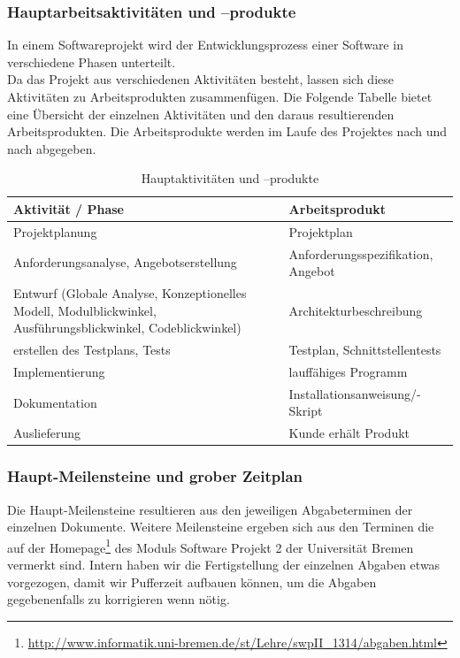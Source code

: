 \documentclass[fontsize=12pt,paper=a4,twoside]{scrartcl}
\begin{document}
\subsubsection{Hauptarbeitsaktivitäten und --produkte}

In einem Softwareprojekt wird der Entwicklungsprozess einer Software in verschiedene Phasen unterteilt.\\
Da das Projekt aus verschiedenen Aktivitäten besteht, lassen sich diese Aktivitäten zu Arbeitsprodukten zusammenfügen. Die Folgende Tabelle bietet eine Übersicht der einzelnen Aktivitäten und den daraus resultierenden Arbeitsprodukten. Die Arbeitsprodukte werden im Laufe des Projektes nach und nach abgegeben.\\

\begin{table}[htbp]
\caption{Hauptaktivitäten und --produkte}
\centering
\begin{tabular}{p{7cm}|p{7cm}}
\hline Aktivität / Phase & Arbeitsprodukt \\ \hline
\hline Projektplanung & Projektplan\\
\hline Anforderungsanalyse, Angebotserstellung & Anforderungsspezifikation, Angebot\\
\hline Entwurf (Globale Analyse, Konzeptionelles Modell, Modulblickwinkel, Ausführungsblickwinkel, Codeblickwinkel) & Architekturbeschreibung\\
\hline erstellen des Testplans, Tests & Testplan, Schnittstellentests\\
\hline Implementierung & lauffähiges Programm\\
\hline Dokumentation & Installationsanweisung/-Skript\\
\hline Auslieferung & Kunde erhält Produkt\\
\hline 
\end{tabular}
\end{table}

\newpage

\subsubsection{Haupt-Meilensteine und grober Zeitplan}

Die Haupt-Meilensteine resultieren aus den jeweiligen Abgabeterminen der einzelnen Dokumente. Weitere Meilensteine ergeben sich aus den Terminen die auf der Homepage\footnote{\url{http://www.informatik.uni-bremen.de/st/Lehre/swpII_1314/abgaben.html}} des Moduls Software Projekt 2 der Universität Bremen vermerkt sind. Intern haben wir die Fertigstellung der einzelnen Abgaben etwas vorgezogen, damit wir Pufferzeit aufbauen können, um die Abgaben gegebenenfalls zu korrigieren wenn nötig.
\end{document}
